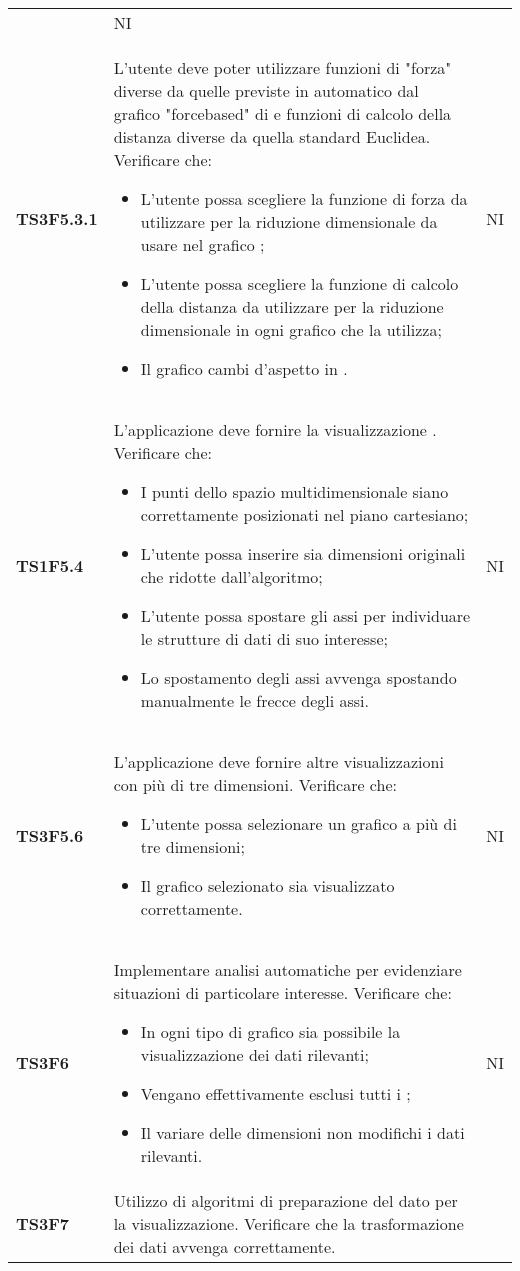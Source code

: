 \begin{longtable}{C{2cm} C{12cm} C{1.5cm}}
				 & NI \\
\textbf{TS3F5.3.1} & L'utente deve poter utilizzare funzioni di "forza" diverse da quelle previste in automatico dal grafico "forcebased" di  e funzioni di calcolo della distanza diverse da quella standard Euclidea. Verificare che:
					\begin{itemize}
						\item L'utente possa scegliere la funzione di forza da utilizzare per la riduzione dimensionale da usare nel grafico ;
						\item L'utente possa scegliere la funzione di calcolo della distanza da utilizzare per la riduzione dimensionale in ogni grafico che la utilizza;
						\item Il grafico cambi d'aspetto in .
					\end{itemize}
				   & NI \\
\textbf{TS1F5.4} & L'applicazione deve fornire la visualizzazione . Verificare che:
					\begin{itemize}
						\item I punti dello spazio multidimensionale siano correttamente posizionati nel piano cartesiano;
						\item L'utente possa inserire sia dimensioni originali che ridotte dall'algoritmo;
						\item L'utente possa spostare gli assi per individuare le strutture di dati di suo interesse;
						\item Lo spostamento degli assi avvenga spostando manualmente le frecce degli assi.
					\end{itemize}	
				   & NI \\
\textbf{TS3F5.6} & L'applicazione deve fornire altre visualizzazioni con più di tre dimensioni. Verificare che:
					\begin{itemize}
						\item L'utente possa selezionare un grafico a più di tre dimensioni;
						\item Il grafico selezionato sia visualizzato correttamente.
					\end{itemize}	
				   & NI \\
\textbf{TS3F6} & Implementare analisi automatiche per evidenziare situazioni di particolare interesse. Verificare che: 
					\begin{itemize}
						\item In ogni tipo di grafico sia possibile la visualizzazione dei dati rilevanti;
						\item Vengano effettivamente esclusi tutti i ;
						\item Il variare delle dimensioni non modifichi i dati rilevanti.
					\end{itemize}		
			   & NI \\
\textbf{TS3F7} & Utilizzo di algoritmi di preparazione del dato per la visualizzazione. Verificare che la trasformazione dei dati avvenga correttamente.
					

\end{longtable}
